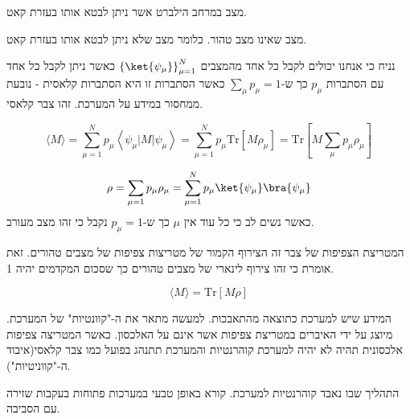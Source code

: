 \documentclass{tstextbook}
\begin{document}
\begin{definition}
מצב במרחב הילברט אשר ניתן לבטא אותו בעזרת קאט.

\end{definition}
\begin{definition}
מצב שאינו מצב טהור. כלומר מצב שלא ניתן לבטא אותו בעזרת קאט.

\end{definition}
נניח כי אנחנו יכולים לקבל כל אחד מהמצבים \(\left\{  \ket{\psi_{\mu}}  \right\}_{\mu=1}^{N}\) כאשר ניתן לקבל כל אחד עם הסתברות \(p_{\mu}\) כך ש-\(\sum_{\mu}p_{\mu} =1\) כאשר הסתברות זו היא הסתברות קלאסית - נובעת ממחסור במידע על המערכת. זהו צבר קלאסי.

\begin{proposition}
$$\langle M \rangle =\sum_{\mu=1}^{N}p_{\mu}\left\langle  \psi_{\mu}|M|\psi_{\mu}  \right\rangle =\sum_{\mu=1}^{N} p_{\mu}\mathrm{Tr}\left[ M\rho_{\mu} \right]=\mathrm{Tr}\left[ M\sum_{\mu}p_{\mu}\rho_{\mu} \right]$$

\end{proposition}
\begin{definition}
$$\rho = \sum_{\mu=1}p_{\mu}\rho_{\mu}=\sum_{\mu=1}^{N}p_{\mu}\ket{\psi_{\mu}}\bra{\psi_{\mu}}  $$
כאשר נשים לב כי כל עוד אין \(\mu\) כך ש-\(p_{\mu}=1\) נקבל כי זהו מצב מעורב.

\end{definition}
\begin{remark}
המטריצת הצפיפות של צבר זה הצירוף הקמור של מטריצות צפיפות של מצבים טהורים. זאת אומרת כי זהו צירוף לינארי של מצבים טהורים כך שסכום המקדמים יהיה 1.

\end{remark}
\begin{corollary}
$$\langle M \rangle = \mathrm{Tr}\left[ M\rho \right]$$

\end{corollary}
\begin{definition}[קוהרנטיות]
המידע שיש למערכת כתוצאה מהתאבכות. למעשה מתאר את ה-"קוונטיות" של המערכת. מיוצג על ידי האיברים במטריצת צפיפות אשר אינם על האלכסון. כאשר המטריצה צפיפות אלכסונית תהיה לא יהיה למערכת קוהרנטיות והמערכת תתנהג בפועל כמו צבר קלאסי(איבוד ה-"קווניטיות").

\end{definition}
\begin{definition}[דקוהרנטיות]
התהליך שבו נאבד קוהרנטיות למערכת. קורא באופן טבעי במערכות פתוחות בעקבות שזירה עם הסביבה.

\end{definition}
\end{document}
